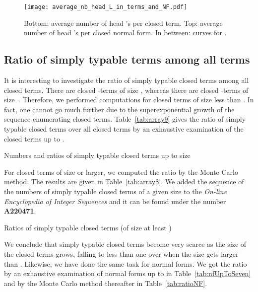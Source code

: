 \documentclass{jfp1}
\begin{document}
\begin{figure}[thb!]
  \centering
  \texttt{[image: average\_nb\_head\_L\_in\_terms\_and\_NF.pdf]}
  \caption{\textsf{Bottom}: average number of head 's per closed term.
    \textsf{Top}: average number of head 's per closed normal form.
    \textsf{In between}: curves  for .}
  \label{fig:L-in-terms}
\end{figure}

    \subsection{Ratio of simply typable terms among all terms}
    \label{sec:ratio-simply-typed}
    It is interesting to investigate the ratio of simply typable closed terms among
    all closed terms.
    There are  closed -terms of size , whereas
    there are  closed -terms of size~. Therefore, we performed
    computations for closed terms of size less than . In fact, one cannot go much
    further due to the superexponential growth of the sequence enumerating closed
    terms.
Table~\ref{tab:array9} gives the ratio of simply typable closed terms over all closed terms by an
    exhaustive examination of the closed terms up to .
 \begin{table*}[htb!]
   \centering
    
   \caption{Numbers and ratios of simply typable closed terms up to size }
   \label{tab:array9}
 \end{table*}
 For closed terms of size  or larger, we computed the ratio by the Monte Carlo
 method. The results are given in Table~\ref{tab:array8}. We added the sequence of the numbers
 of simply typable closed terms of a given size to the \emph{On-line
   Encyclopedia of Integer Sequences} and it can be found under the number \textbf{A220471}.
 \begin{table*}[htb!]
   \centering
     \begin{scriptsize}
       
     \end{scriptsize}
   \caption{Ratios of simply typable closed terms (of size at least )}
   \label{tab:array8}
 \end{table*}


 We conclude that simply typable closed terms become very scarce as the size of the
 closed terms grows, falling to less than one over  when the size gets
 larger than .  Likewise, we have done the same task for normal forms.  We got
 the ratio by an exhaustive examination of normal forms up to  in
 Table~\ref{tab:nfUpToSeven} and by the Monte Carlo method thereafter in
 Table~\ref{tab:ratioNF}.
\end{document}
